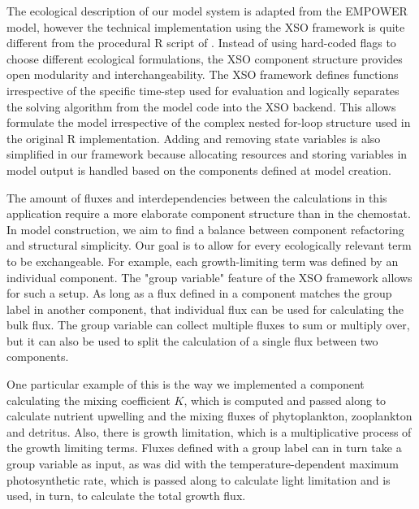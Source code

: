 \documentclass[journal abbreviation, manuscript]{copernicus}
\begin{document}
The ecological description of our model system is adapted from the EMPOWER model, however the technical implementation using the XSO framework is quite different from the procedural R script of \citet{Anderson2015c}. Instead of using hard-coded flags to choose different ecological formulations, the XSO component structure provides open modularity and interchangeability. The XSO framework defines functions irrespective of the specific time-step used for evaluation and logically separates the solving algorithm from the model code into the XSO backend. This allows formulate the model irrespective of the complex nested for-loop structure used in the original R implementation. Adding and removing state variables is also simplified in our framework because allocating resources and storing variables in model output is handled based on the components defined at model creation.

The amount of fluxes and interdependencies between the calculations in this application require a more elaborate component structure than in the chemostat. In model construction, we aim to find a balance between component refactoring and structural simplicity. Our goal is to allow for every ecologically relevant term to be exchangeable. For example, each growth-limiting term was defined by an individual component. The "group variable" feature of the XSO framework allows for such a setup. As long as a flux defined in a component matches the group label in another component, that individual flux can be used for calculating the bulk flux. The group variable can collect multiple fluxes to sum or multiply over, but it can also be used to split the calculation of a single flux between two components.

One particular example of this is the way we implemented a component calculating the mixing coefficient $K$, which is computed and passed along to calculate nutrient upwelling and the mixing fluxes of phytoplankton, zooplankton and detritus. Also, there is growth limitation, which is a multiplicative process of the growth limiting terms. Fluxes defined with a group label can in turn take a group variable as input, as was did with the temperature-dependent maximum photosynthetic rate, which is passed along to calculate light limitation and is used, in turn, to calculate the total growth flux. 
\end{document}
